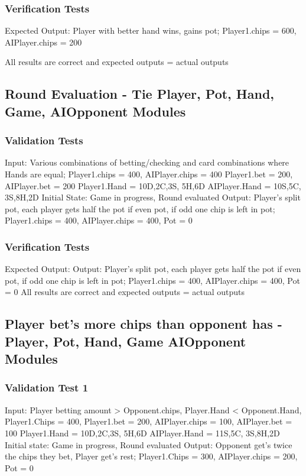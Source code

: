 \documentclass[11pt]{article}
\begin{document}
\subsubsection{Verification Tests}
Expected Output: Player with better hand wins, gains pot; Player1.chips = 600, AIPlayer.chips = 200

All results are correct and expected outputs = actual outputs

\subsection{Round Evaluation - Tie Player, Pot, Hand, Game, AIOpponent Modules}

\subsubsection{Validation Tests}
Input: Various combinations of betting/checking and card combinations where Hands are equal;
Player1.chips = 400, AIPlayer.chips = 400 Player1.bet = 200, AIPlayer.bet = 200
Player1.Hand = 10D,2C,3S, 5H,6D AIPlayer.Hand = 10S,5C, 3S,8H,2D
Initial State: Game in progress, Round evaluated
Output: Player’s split pot, each player gets half the pot if even pot, if odd one chip is left in pot; Player1.chips = 400, AIPlayer.chips = 400, Pot = 0

\subsubsection{Verification Tests}
Expected Output: Output: Player’s split pot, each player gets half the pot if even pot, if odd one chip is left in pot; Player1.chips = 400, AIPlayer.chips = 400, Pot = 0
All results are correct and expected outputs = actual outputs

\subsection{Player bet’s more chips than opponent has - Player, Pot, Hand, Game AIOpponent Modules}

\subsubsection{Validation Test 1}
Input: Player betting amount > Opponent.chips, Player.Hand < Opponent.Hand,
Player1.Chips = 400, Player1.bet = 200, AIPlayer.chips = 100, AIPlayer.bet = 100
Player1.Hand = 10D,2C,3S, 5H,6D AIPlayer.Hand = 11S,5C, 3S,8H,2D
Initial state: Game in progress, Round evaluated
Output: Opponent get’s twice the chips they bet, Player get’s rest;
Player1.Chips = 300, AIPlayer.chips = 200, Pot = 0
\end{document}
